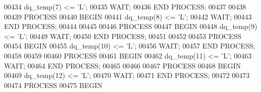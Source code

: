 \begin{DoxyCode}
00434     \textcolor{vhdlchar}{dq_temp}\textcolor{vhdlchar}{(}\textcolor{vhdllogic}{}\textcolor{vhdllogic}{7}\textcolor{vhdlchar}{)} \textcolor{vhdlchar}{<=} \textcolor{vhdlchar}{'}\textcolor{vhdlchar}{L}\textcolor{vhdlchar}{'};  
00435   \textcolor{keywordflow}{WAIT};
00436   \textcolor{keywordflow}{END} \textcolor{keywordflow}{PROCESS};
00437   
00438   
00439   \textcolor{keywordflow}{PROCESS}
00440   \textcolor{keywordflow}{BEGIN}
00441     \textcolor{vhdlchar}{dq_temp}\textcolor{vhdlchar}{(}\textcolor{vhdllogic}{}\textcolor{vhdllogic}{8}\textcolor{vhdlchar}{)} \textcolor{vhdlchar}{<=} \textcolor{vhdlchar}{'}\textcolor{vhdlchar}{L}\textcolor{vhdlchar}{'};  
00442   \textcolor{keywordflow}{WAIT};
00443   \textcolor{keywordflow}{END} \textcolor{keywordflow}{PROCESS};
00444   
00445   
00446   \textcolor{keywordflow}{PROCESS}
00447   \textcolor{keywordflow}{BEGIN}
00448     \textcolor{vhdlchar}{dq_temp}\textcolor{vhdlchar}{(}\textcolor{vhdllogic}{}\textcolor{vhdllogic}{9}\textcolor{vhdlchar}{)} \textcolor{vhdlchar}{<=} \textcolor{vhdlchar}{'}\textcolor{vhdlchar}{L}\textcolor{vhdlchar}{'};  
00449   \textcolor{keywordflow}{WAIT};
00450   \textcolor{keywordflow}{END} \textcolor{keywordflow}{PROCESS};
00451   
00452   
00453   \textcolor{keywordflow}{PROCESS}
00454   \textcolor{keywordflow}{BEGIN}
00455     \textcolor{vhdlchar}{dq_temp}\textcolor{vhdlchar}{(}\textcolor{vhdllogic}{}\textcolor{vhdllogic}{10}\textcolor{vhdlchar}{)} \textcolor{vhdlchar}{<=} \textcolor{vhdlchar}{'}\textcolor{vhdlchar}{L}\textcolor{vhdlchar}{'};  
00456   \textcolor{keywordflow}{WAIT};
00457   \textcolor{keywordflow}{END} \textcolor{keywordflow}{PROCESS};
00458   
00459   
00460   \textcolor{keywordflow}{PROCESS}
00461   \textcolor{keywordflow}{BEGIN}
00462     \textcolor{vhdlchar}{dq_temp}\textcolor{vhdlchar}{(}\textcolor{vhdllogic}{}\textcolor{vhdllogic}{11}\textcolor{vhdlchar}{)} \textcolor{vhdlchar}{<=} \textcolor{vhdlchar}{'}\textcolor{vhdlchar}{L}\textcolor{vhdlchar}{'};  
00463   \textcolor{keywordflow}{WAIT};
00464   \textcolor{keywordflow}{END} \textcolor{keywordflow}{PROCESS};
00465   
00466   
00467   \textcolor{keywordflow}{PROCESS}
00468   \textcolor{keywordflow}{BEGIN}
00469     \textcolor{vhdlchar}{dq_temp}\textcolor{vhdlchar}{(}\textcolor{vhdllogic}{}\textcolor{vhdllogic}{12}\textcolor{vhdlchar}{)} \textcolor{vhdlchar}{<=} \textcolor{vhdlchar}{'}\textcolor{vhdlchar}{L}\textcolor{vhdlchar}{'};  
00470   \textcolor{keywordflow}{WAIT};
00471   \textcolor{keywordflow}{END} \textcolor{keywordflow}{PROCESS};
00472   
00473   
00474   \textcolor{keywordflow}{PROCESS}
00475   \textcolor{keywordflow}{BEGIN}

\end{DoxyCode}
